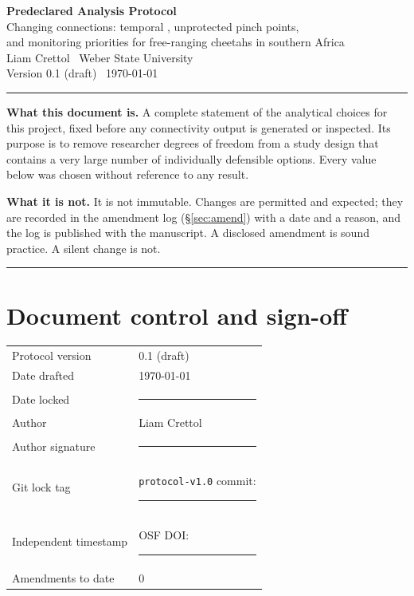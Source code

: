 \begin{center}
{\LARGE\bfseries\color{navy} Predeclared Analysis Protocol}\\[6pt]
{\large Changing connections: temporal \structconn, unprotected pinch points,\\
and monitoring priorities for free-ranging cheetahs in southern Africa}\\[10pt]
{Liam Crettol \textbullet\ Weber State University}\\[4pt]
{Version 0.1 (draft) \textbullet\ \today}
\end{center}

\vspace{6pt}
\hrule
\vspace{10pt}

\noindent\textbf{What this document is.} A complete statement of the analytical
choices for this project, fixed before any connectivity output is generated or
inspected. Its purpose is to remove researcher degrees of freedom from a study
design that contains a very large number of individually defensible options.
Every value below was chosen without reference to any result.

\noindent\textbf{What it is not.} It is not immutable. Changes are permitted and
expected; they are recorded in the amendment log (\S\ref{sec:amend}) with a date
and a reason, and the log is published with the manuscript. A disclosed
amendment is sound practice. A silent change is not.

\vspace{10pt}
\hrule

\section{Document control and sign-off}

\begin{tabular}{@{}p{4.2cm}p{10.5cm}@{}}
\toprule
Protocol version & 0.1 (draft) \\
Date drafted & \today \\
Date locked & \rule{5cm}{0.4pt} \\
Author & Liam Crettol \\
Author signature & \rule{5cm}{0.4pt} \\
Git lock tag & \texttt{protocol-v1.0} \quad commit: \rule{3cm}{0.4pt} \\
Independent timestamp & OSF DOI: \rule{4cm}{0.4pt} \\
Amendments to date & 0 \\
\bottomrule
\end{tabular}


